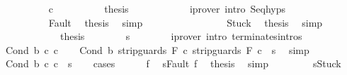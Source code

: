 \begin{isabellebody}
\ \ \ \ \ \ \ \ \isamarkupfalse%
\ c{}\isanewline
\ \ \ \ \ \ \ \ \isamarkupfalse%
\ {\isacharquery}thesis\isanewline
\ \ \ \ \ \ \ \ \ \ \isamarkupfalse%
\ {\isacharparenleft}iprover\ intro{\isacharcolon}\ Seq{\isachardot}hyps{\isacharparenright}\isanewline
\ \ \ \ \ \ \isamarkupfalse%
\isanewline
\ \ \ \ \ \ \ \ \isamarkupfalse%
\ Fault\ \isamarkupfalse%
\ {\isacharquery}thesis\ \isamarkupfalse%
\ simp\isanewline
\ \ \ \ \ \ \isamarkupfalse%
\isanewline
\ \ \ \ \ \ \ \ \isamarkupfalse%
\ Stuck\ \isamarkupfalse%
\ {\isacharquery}thesis\ \isamarkupfalse%
\ simp\isanewline
\ \ \ \ \ \ \isamarkupfalse%
\isanewline
\ \ \ \ \isacommand{{\isacharbraceright}}\isamarkupfalse%
\isanewline
\ \ \ \ \isamarkupfalse%
\ \isamarkupfalse%
\ {\isacharquery}thesis\isanewline
\ \ \ \ \ \ \isamarkupfalse%
\ s\isanewline
\ \ \ \ \ \ \isamarkupfalse%
\ {\isacharparenleft}iprover\ intro{\isacharcolon}\ terminates{\isachardot}intros{\isacharparenright}\isanewline
\ \ \isamarkupfalse%
\isanewline
{}\isamarkupfalse%
\isanewline
\ \ \isamarkupfalse%
\ {\isacharparenleft}Cond\ b\ c{}\ c{}{\isacharparenright}\isanewline
\ \ \isamarkupfalse%
\ {\isachardoublequoteopen}{\isasymGamma}{\isasymturnstile}Cond\ b\ {\isacharparenleft}strip{\isacharunderscore}guards\ F\ c{}{\isacharparenright}\ {\isacharparenleft}strip{\isacharunderscore}guards\ F\ c{}{\isacharparenright}\ {\isasymdown}\ s{\isachardoublequoteclose}\ \isamarkupfalse%
\ simp\isanewline
\ \ \isamarkupfalse%
\ {\isachardoublequoteopen}{\isasymGamma}{\isasymturnstile}Cond\ b\ c{}\ c{}\ {\isasymdown}\ s{\isachardoublequoteclose}\isanewline
\ \ \isamarkupfalse%
\ {\isacharparenleft}cases{\isacharparenright}\isanewline
\ \ \ \ \isamarkupfalse%
\ f\ \isamarkupfalse%
\ {\isachardoublequoteopen}s{\isacharequal}Fault\ f{\isachardoublequoteclose}\ \isamarkupfalse%
\ {\isacharquery}thesis\ \isamarkupfalse%
\ simp\isanewline
\ \ \isamarkupfalse%
\isanewline
\ \ \ \ \isamarkupfalse%
\ {\isachardoublequoteopen}s{\isacharequal}Stuck{\isachardoublequoteclose}\ \isamarkupfalse%

\end{isabellebody}
